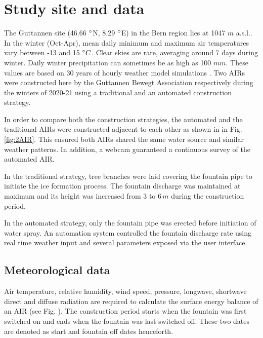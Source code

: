 \documentclass[tc, manuscript]{copernicus}
\begin{document}
\section{Study site and data}

The Guttannen site (46.66 $^{\circ}$N, 8.29 $^{\circ}$E) in the Bern region lies at 1047 $m$ a.s.l.. In the winter
(Oct-Apr), mean daily minimum and maximum air temperatures vary between -13 and 15 $^{\circ} C$. Clear skies are
rare, averaging around 7 days during winter. Daily winter precipitation can sometimes be as high as 100 $mm$.
These values are based on 30 years of hourly weather model simulations \citep{guttannen}. Two AIRs were
constructed here by the Guttannen Bewegt Association respectively during the winters of 2020-21 using a
traditional and an automated construction strategy.



In order to compare both the construction strategies, the automated and the traditional AIRs were constructed
adjacent to each other as shown in in Fig. \ref{fig:2AIR}. This ensured both AIRs shared the same water source
and similar weather patterns. In addition, a webcam guaranteed a continuous survey of the automated AIR.   

In the traditional strategy, tree branches were laid covering the fountain pipe to initiate the ice formation
process. The fountain discharge was maintained at maximum and its height was increased from 3 to 6\,$m$ during
the construction period.

In the automated strategy, only the fountain pipe was erected before initiation of water spray. An automation
system controlled the fountain discharge rate using real time weather input and several parameters exposed via
the user interface. 

\subsection{Meteorological data}
Air temperature, relative humidity, wind speed, pressure, longwave, shortwave direct and diffuse radiation are
required to calculate the surface energy balance of an AIR (see Fig. ). The construction period starts when the
fountain was first switched on and ends when the fountain was last switched off. These two dates are denoted as
start and fountain off dates henceforth.
\end{document}

